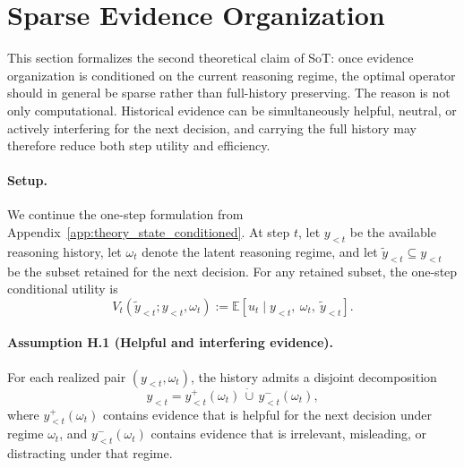 \section{Sparse Evidence Organization}
\label{app:theory_sparse}

This section formalizes the second theoretical claim of SoT:
once evidence organization is conditioned on the current reasoning regime, the optimal operator should in general be sparse rather than full-history preserving.
The reason is not only computational.
Historical evidence can be simultaneously helpful, neutral, or actively interfering for the next decision, and carrying the full history may therefore reduce both step utility and efficiency.

\paragraph{Setup.}
We continue the one-step formulation from Appendix~\ref{app:theory_state_conditioned}.
At step \(t\), let \(y_{<t}\) be the available reasoning history, let \(\omega_t\) denote the latent reasoning regime, and let \(\widetilde y_{<t}\subseteq y_{<t}\) be the subset retained for the next decision.
For any retained subset, the one-step conditional utility is
\begin{equation}
V_t(\widetilde y_{<t}; y_{<t}, \omega_t)
:=
\mathbb{E}\!\left[
u_t
\mid
y_{<t},\ \omega_t,\ \widetilde y_{<t}
\right].
\label{eq:app_sparse_value}
\end{equation}

\paragraph{Assumption H.1 (Helpful and interfering evidence).}
For each realized pair \((y_{<t},\omega_t)\), the history admits a disjoint decomposition
\begin{equation}
y_{<t}
=
y_{<t}^{+}(\omega_t)\,\dot\cup\,y_{<t}^{-}(\omega_t),
\label{eq:app_sparse_decomp_hist}
\end{equation}
where \(y_{<t}^{+}(\omega_t)\) contains evidence that is helpful for the next decision under regime \(\omega_t\), and \(y_{<t}^{-}(\omega_t)\) contains evidence that is irrelevant, misleading, or distracting under that regime.

